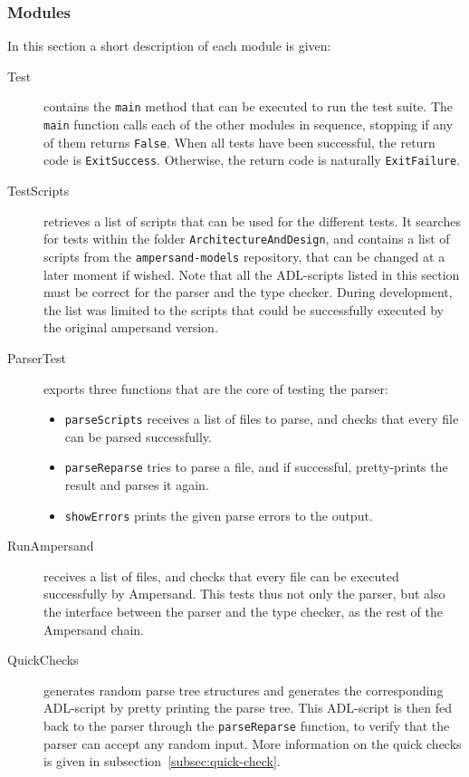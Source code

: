   \subsubsection{Modules}
  \label{subsec:test-modules}
  In this section a short description of each module is given:%
  \begin{description}
    \item[Test] contains the \texttt{main} method that can be executed to run the test suite.
      The \texttt{main} function calls each of the other modules in sequence, stopping if any of them returns \texttt{False}.
      When all tests have been successful, the return code is \texttt{ExitSuccess}.
      Otherwise, the return code is naturally \texttt{ExitFailure}.
    
    \item[TestScripts] retrieves a list of scripts that can be used for the different tests.
      It searches for tests within the folder \texttt{ArchitectureAndDesign}, and contains a list of scripts from the \texttt{ampersand-models} repository, that can be changed at a later moment if wished.
      Note that all the ADL-scripts listed in this section must be correct for the parser and the type checker.
      During development, the list was limited to the scripts that could be successfully executed by the original ampersand version.
    
    \item[ParserTest] exports three functions that are the core of testing the parser:
      \begin{itemize}
        \item \texttt{parseScripts} receives a list of files to parse, and checks that every file can be parsed successfully.
        \item \texttt{parseReparse} tries to parse a file, and if successful, pretty-prints the result and parses it again.
        \item \texttt{showErrors} prints the given parse errors to the output.
      \end{itemize}
    
    \item[RunAmpersand] receives a list of files, and checks that every file can be executed successfully by Ampersand.
      This tests thus not only the parser, but also the interface between the parser and the type checker, as the rest of the Ampersand chain.
    
    \item[QuickChecks] generates random parse tree structures and generates the corresponding ADL-script by pretty printing the parse tree.
      This ADL-script is then fed back to the parser through the \texttt{parseReparse} function, to verify that the parser can accept any random input.
      More information on the quick checks is given in subsection~\ref{subsec:quick-check}.
    

\end{description}
